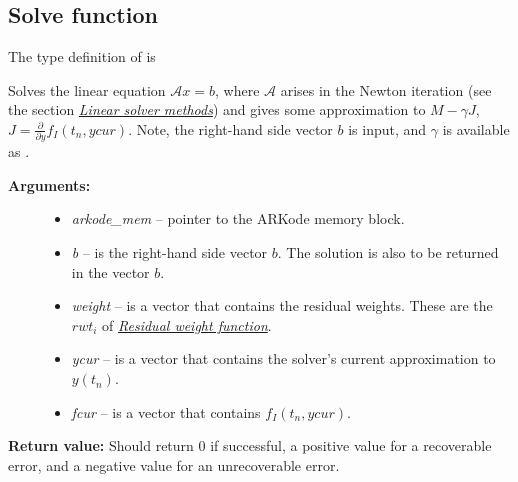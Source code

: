 \documentclass[letterpaper,10pt,english]{sphinxmanual}
\begin{document}
\subsection{Solve function}
\label{linear_solvers/custom:solve-function}
The type definition of {\hyperref[linear_solvers/custom:lsolve]{}} is

\begin{fulllineitems}
\label{linear_solvers/custom:lsolve}
Solves the linear equation ${\mathcal A} x = b$, where
${\mathcal A}$ arises  in the Newton iteration (see the
section {\hyperref[Mathematics:mathematics-linear]{\emph{Linear solver methods}}}) and gives some approximation to
$M - \gamma J$, $J = \frac{\partial}{\partial y} f_I(t_n, ycur)$.
Note, the right-hand side vector
$b$ is input, and $\gamma$ is available as
.
\begin{description}
\item[{\textbf{Arguments:}}] \leavevmode\begin{itemize}
\item {} 
\emph{arkode\_mem} -- pointer to the ARKode memory block.

\item {} 
\emph{b} -- is the right-hand side vector $b$. The solution
is also to be returned in the vector $b$.

\item {} 
\emph{weight} -- is a vector that contains the residual weights. These
are the $rwt_i$ of {\hyperref[c_interface/User_supplied:cinterface-residualweight]{\emph{Residual weight function}}}.

\item {} 
\emph{ycur} -- is a vector that contains the solver's current
approximation to $y(t_n)$.

\item {} 
\emph{fcur} -- is a vector that contains $f_I(t_n, ycur)$.

\end{itemize}

\end{description}

\textbf{Return value:}  Should return 0 if successful, a positive value
for a recoverable error, and a negative value for an unrecoverable
error.

\end{fulllineitems}
\end{document}
